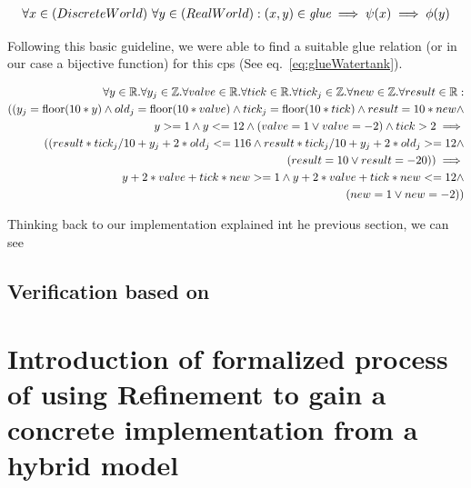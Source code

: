\begin{equation}
	\centering
	\begin{split}
		\forall x \in (Discrete World)~\forall y \in (Real World):(x,y) \in \textit{glue} \implies \psi(x) \implies \phi(y)
	\end{split}
	\label{eq:glueGeneral}
\end{equation}

Following this basic guideline, we were able to find a suitable glue relation (or in our case a bijective function) for this cps (See eq.~\ref{eq:glueWatertank}).

\begin{equation}
	\centering
	\begin{split}
		\forall y \in \mathbb{R} . \forall y_j \in \mathbb{Z}. \forall valve \in \mathbb{R}. \forall tick \in \mathbb{R}. \forall tick_j \in \mathbb{Z} . \forall new \in \mathbb{Z}. \forall result \in \mathbb{R} : \\  ((y_j = \textrm{floor}(10 * y) \wedge old_j = \textrm{floor}(10*valve) \wedge tick_j = \textrm{floor}(10*tick) \wedge result = 10 * new \wedge \\ y >= 1 \wedge y <= 12 \wedge (valve = 1  \vee valve = -2) \wedge tick > 2 \implies \\  ((result * tick_j/10 + y_j + 2 * old_j <= 116 \wedge result * tick_j/10 + y_j + 2 * old_j >= 12 \wedge \\ (result = 10 \vee result = -20)) \implies \\ y + 2 * valve + tick * new >= 1 \wedge y + 2 * valve + tick * new <= 12 \wedge \\ (new = 1 \vee new = -2))
	\end{split}
	\label{eq:glueWatertank}
\end{equation}

Thinking back to our implementation explained int he previous section, we can see
\section{Verification based on \keym}
\label{sec:Watertank:Verification}



\chapter{Introduction of formalized process of using Refinement to gain a concrete implementation from a hybrid model}
\label{ch:Process}

